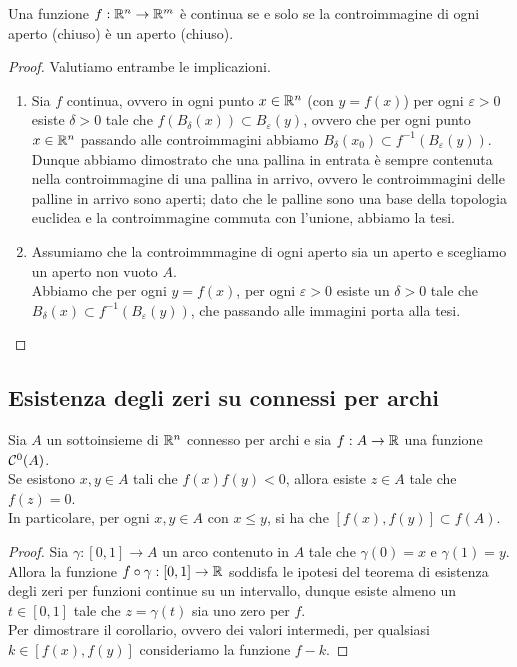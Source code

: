 \documentclass{article}
\begin{document}
\begin{theorem}{}{}
    Una funzione $f:\mathbb{R}^n \to \mathbb{R}^m$ è continua se e solo se la controimmagine di ogni aperto (chiuso) è un aperto (chiuso).
\end{theorem}
\begin{proof}
    Valutiamo entrambe le implicazioni.\begin{enumerate}
        \item Sia $f$ continua, ovvero in ogni punto $x\in\mathbb{R}^n$ (con $y=f(x)$) per ogni $\varepsilon>0$ esiste $\delta>0$ tale che $f(B_\delta(x)) \subset B_\varepsilon (y)$, ovvero che per ogni punto $x\in\mathbb{R}^n$ passando alle controimmagini abbiamo $B_\delta(x_0) \subset f^{-1}(B_\varepsilon(y))$.\\ Dunque abbiamo dimostrato che una pallina in entrata è sempre contenuta nella controimmagine di una pallina in arrivo, ovvero le controimmagini delle palline in arrivo sono aperti; dato che le palline sono una base della topologia euclidea e la controimmagine commuta con l'unione, abbiamo la tesi.
        \item Assumiamo che la controimmmagine di ogni aperto sia un aperto e scegliamo un aperto non vuoto $A$.\\
        Abbiamo che per ogni $y = f(x)$, per ogni $\varepsilon>0$ esiste un $\delta>0$ tale che $B_\delta(x) \subset f^{-1}(B_\varepsilon(y))$, che passando alle immagini porta alla tesi.
    \end{enumerate}
\end{proof}

\subsection{Esistenza degli zeri su connessi per archi}

\begin{theorem}{}{}
    Sia $A$ un sottoinsieme di $\mathbb{R}^n$ connesso per archi e sia $f: A\to\mathbb{R}$ una funzione $\mathcal{C}^0(A)$.\\
    Se esistono $x,y \in A$ tali che $f(x)f(y)<0$, allora esiste $z \in A$ tale che $f(z)=0$.\\
    In particolare, per ogni $x,y \in A$ con $x\le y$, si ha che $[f(x), f(y)] \subset f(A)$.
\end{theorem}
\begin{proof}
    Sia $\gamma : [0,1] \to A$ un arco contenuto in $A$ tale che $\gamma(0) = x$ e $\gamma(1)=y$.\\
    Allora la funzione $f\circ \gamma : [0,1] \to \mathbb{R}$ soddisfa le ipotesi del teorema di esistenza degli zeri per funzioni continue su un intervallo, dunque esiste almeno un $t \in [0,1]$ tale che $z = \gamma(t)$ sia uno zero per $f$. \\
    Per dimostrare il corollario, ovvero dei valori intermedi, per qualsiasi $k \in [f(x),f(y)]$ consideriamo la funzione $f-k$.
\end{proof}
\end{document}
